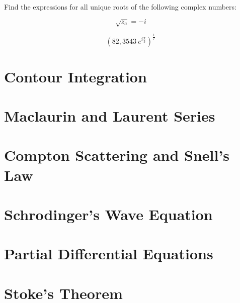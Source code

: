 \documentclass{article}
\begin{document}
Find the expressions for all unique roots of the following complex numbers:

\begin{equation}
  \sqrt{z_{a}} = -i
\end{equation}

\begin{equation}
  \left( 82,3543 \ e^{i \frac{\pi}{3}} \right)^{\frac{1}{7}}
\end{equation}

\clearpage
\section{Contour Integration}

\clearpage
\section{Maclaurin and Laurent Series}

\clearpage
\section{Compton Scattering and Snell's Law}

\clearpage
\section{Schrodinger's Wave Equation}

\clearpage
\section{Partial Differential Equations}

\clearpage
\section{Stoke's Theorem}
\end{document}
